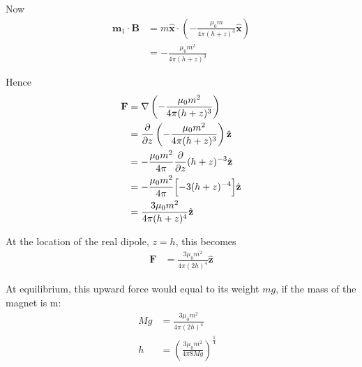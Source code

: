 \documentclass[12pt]{article}
\begin{document}
\begin{enumerate}
Now
$$
\begin{aligned}
\mathbf m_1\cdot \mathbf B
&=
m\hat{\mathbf x}\cdot
\left(
-\frac{\mu_0 m}{4\pi(h+z)^3}\hat{\mathbf x}
\right) \\
&=
-\frac{\mu_0 m^2}{4\pi(h+z)^3}
\end{aligned}
$$

Hence
$$
\begin{aligned}
\mathbf F
&=
\nabla\left(
-\frac{\mu_0 m^2}{4\pi(h+z)^3}
\right) \\
&=
\frac{\partial}{\partial z}
\left(
-\frac{\mu_0 m^2}{4\pi(h+z)^3}
\right)\hat{\mathbf z} \\
&=
-\frac{\mu_0 m^2}{4\pi}\frac{\partial}{\partial z}(h+z)^{-3}\hat{\mathbf z} \\
&=
-\frac{\mu_0 m^2}{4\pi}\Bigl[-3(h+z)^{-4}\Bigr]\hat{\mathbf z} \\
&=
\frac{3\mu_0 m^2}{4\pi(h+z)^4}\hat{\mathbf z}
\end{aligned}
$$

At the location of the real dipole, \(z=h\), this becomes
$$
\begin{aligned}
\mathbf F
&=
\frac{3\mu_0 m^2}{4\pi(2h)^4}\hat{\mathbf z}
\end{aligned}
$$

At equilibrium, this upward force would equal to its weight \(mg\), if the mass of the magnet is m:
$$
\begin{aligned}
Mg &= \frac{3\mu_0 m^2}{4\pi(2h)^4}&\\
h&=\left( \frac{3\mu_{0}m^{2}}{4\pi 8 Mg}  \right)^ {\frac{1}{4}}    \\
\end{aligned}
$$
\end{enumerate}
\end{document}
